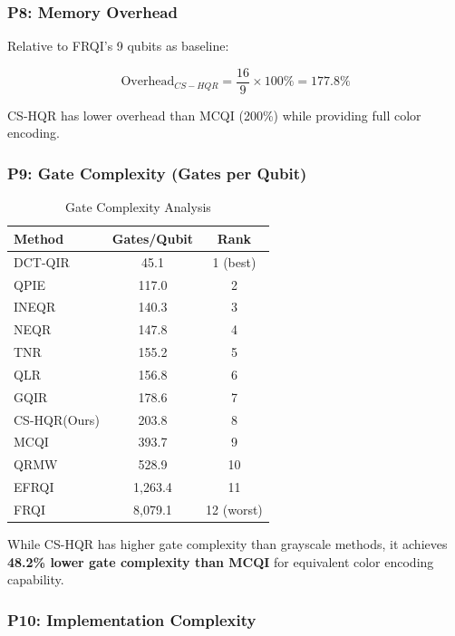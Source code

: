 \documentclass[11pt,a4paper]{article}
\begin{document}
\subsubsection{P8: Memory Overhead}

Relative to FRQI's 9 qubits as baseline:

\begin{equation}
\text{Overhead}_{CS-HQR} = \frac{16}{9} \times 100\% = 177.8\%
\label{eq:overhead}
\end{equation}

CS-HQR has lower overhead than MCQI (200\%) while providing full color encoding.

\subsubsection{P9: Gate Complexity (Gates per Qubit)}

\begin{table}[H]
\centering
\caption{Gate Complexity Analysis}
\label{tab:gate_complexity}
\begin{tabular}{@{}lcc@{}}
\toprule
\textbf{Method} & \textbf{Gates/Qubit} & \textbf{Rank} \\
\midrule
DCT-QIR & 45.1 & 1 (best) \\
QPIE & 117.0 & 2 \\
INEQR & 140.3 & 3 \\
NEQR & 147.8 & 4 \\
TNR & 155.2 & 5 \\
QLR & 156.8 & 6 \\
GQIR & 178.6 & 7 \\
\rowcolor{green!15}
CS-HQR(Ours) & 203.8 & 8 \\
MCQI & 393.7 & 9 \\
QRMW & 528.9 & 10 \\
EFRQI & 1,263.4 & 11 \\
FRQI & 8,079.1 & 12 (worst) \\
\bottomrule
\end{tabular}
\end{table}

While CS-HQR has higher gate complexity than grayscale methods, it achieves \textbf{48.2\% lower gate complexity than MCQI} for equivalent color encoding capability.

\subsubsection{P10: Implementation Complexity}
\end{document}
